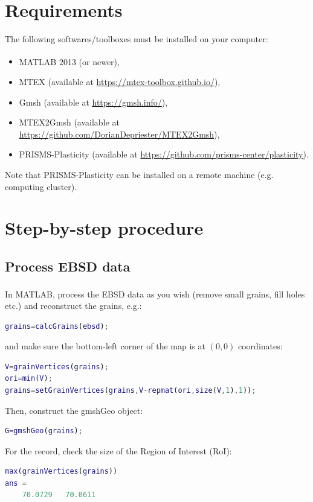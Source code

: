 \documentclass[a4paper]{scrartcl}
\newcommand{\matlab}{MATLAB\textsuperscript{\textregistered}}
\begin{document}
\section{Requirements}
	The following softwares/toolboxes must be installed on your computer:
	\begin{itemize}
		\item MATLAB\textsuperscript{\textregistered} 2013 (or newer),
		\item MTEX (available at \url{https://mtex-toolbox.github.io/}),
		\item Gmsh (available at \url{https://gmsh.info/}),
		\item MTEX2Gmsh (available at \url{https://github.com/DorianDepriester/MTEX2Gmsh}),
		\item PRISMS-Plasticity (available at \url{https://github.com/prisms-center/plasticity}).
	\end{itemize}
	Note that PRISMS-Plasticity can be installed on a remote machine (e.g. computing cluster).

\section{Step-by-step procedure}
	\subsection{Process EBSD data}
	\label{sec:process}
	In \matlab{}, process the EBSD data as you wish (remove small grains, fill holes etc.) and reconstruct the grains, e.g.:
	\begin{lstlisting}[language=Matlab]
grains=calcGrains(ebsd);
	\end{lstlisting}
	and make sure the bottom-left corner of the map is at $(0,0)$ coordinates:
	\begin{lstlisting}[language=Matlab]
V=grainVertices(grains);
ori=min(V);
grains=setGrainVertices(grains,V-repmat(ori,size(V,1),1));
	\end{lstlisting}
	Then, construct the gmshGeo object:
	\begin{lstlisting}[language=Matlab]
G=gmshGeo(grains);
	\end{lstlisting}
	For the record, check the size of the Region of Interest (RoI):
	\begin{lstlisting}[language=Matlab]
max(grainVertices(grains))
ans =
	70.0729   70.0611	
	\end{lstlisting}
	
	
\end{document}
